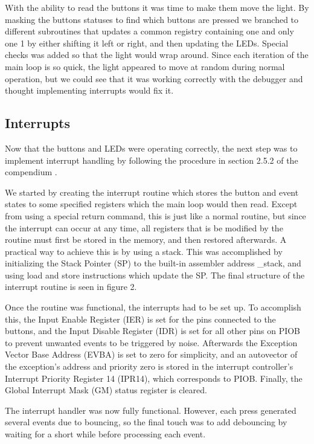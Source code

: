With the ability to read the buttons it was time to make them move the light. By masking the buttons statuses to find which buttons are pressed we branched to different subroutines that updates a common registry containing one and only one 1 by either shifting it left or right, and then updating the LEDs. Special checks was added so that the light would wrap around. Since each iteration of the main loop is so quick, the light appeared to move at random during normal operation, but we could see that it was working correctly with the debugger and thought implementing interrupts would fix it.
\subsection{Interrupts}

Now that the buttons and LEDs were operating correctly, the next step was to implement interrupt handling by following the procedure in section 2.5.2 of the compendium \cite{compendium}.

We started by creating the interrupt routine which stores the button and event states to some specified registers which the main loop would then read. Except from using a special return command, this is just like a normal routine, but since the interrupt can occur at any time, all registers that is be modified by the routine must first be stored in the memory, and then restored afterwards. A practical way to achieve this is by using a stack. This was accomplished by initializing the Stack Pointer (SP) to the built-in assembler address \_stack, and using load and store instructions which update the SP. The final structure of the interrupt routine is seen in figure 2.

Once the routine was functional, the interrupts had to be set up. To accomplish this, the Input Enable Register (IER) is set for the pins connected to the buttons, and the Input Disable Register (IDR) is set for all other pins on PIOB to prevent unwanted events to be triggered by noise. Afterwards the Exception Vector Base Address (EVBA) is set to zero for simplicity, and an autovector of the exception’s address and priority zero is stored in the interrupt controller’s Interrupt Priority Register 14 (IPR14), which corresponds to PIOB. Finally, the Global Interrupt Mask (GM) status register is cleared.

The interrupt handler was now fully functional. However, each press generated several events due to bouncing, so the final touch was to add debouncing by waiting for a short while before processing each event.
